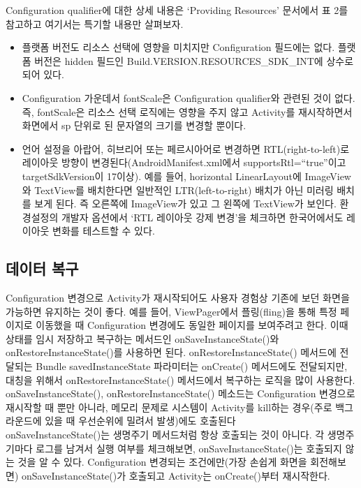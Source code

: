Configuration qualifier에 대한 상세 내용은 `Providing Resources' 문서에서 표 2를 참고하고 여기서는 특기할 내용만 살펴보자.
\begin{itemize}
\item 플랫폼 버전도 리소스 선택에 영향을 미치지만  Configuration 필드에는 없다. 플랫폼 버전은 hidden 필드인 Build.VERSION.RESOURCES\_SDK\_INT에 상수로 되어 있다. 
\item Configuration 가운데서 fontScale은 Configuration qualifier와 관련된 것이 없다. 즉, fontScale은 리소스 선택 로직에는 영향을 주지 않고 Activity를 재시작하면서 화면에서 sp 단위로 된 문자열의 크기를 변경할 뿐이다.
\item 언어 설정을 아랍어, 히브리어 또는 페르시아어로 변경하면 RTL(right-to-left)로 레이아웃 방향이 변경된다(AndroidManifest.xml에서 supportsRtl=``true''이고 targetSdkVersion이 17이상). 예를 들어, horizontal LinearLayout에 ImageView와 TextView를 배치한다면 일반적인 LTR(left-to-right) 배치가 아닌 미러링 배치를 보게 된다. 즉 오른쪽에 ImageView가 있고 그 왼쪽에 TextView가 보인다. 환경설정의 개발자 옵션에서 `RTL 레이아웃 강제 변경'을 체크하면 한국어에서도 레이아웃 변화를 테스트할 수 있다. 
\end{itemize}

\subsection{데이터 복구}
Configuration 변경으로 Activity가 재시작되어도 사용자 경험상 기존에 보던 화면을 가능하면 유지하는 것이 좋다. 예를 들어, ViewPager에서 플링(fling)을 통해 특정 페이지로 이동했을 때 Configuration 변경에도 동일한 페이지를 보여주려고 한다. 이때 상태를 임시 저장하고 복구하는 메서드인 onSaveInstanceState()와 onRestoreInstanceState()를 사용하면 된다. onRestoreInstanceState() 메서드에 전달되는 Bundle savedInstanceState 파라미터는 onCreate() 메서드에도 전달되지만, 대칭을 위해서 onRestoreInstanceState() 메서드에서 복구하는 로직을 많이 사용한다.
onSaveInstanceState(), onRestoreInstanceState() 메소드는 Configuration 변경으로 재시작할 때 뿐만 아니라, 메모리 문제로 시스템이 Activity를 kill하는 경우(주로 백그라운드에 있을 때 우선순위에 밀려서 발생)에도 호출된다\\

onSaveInstanceState()는 생명주기 메서드처럼 항상 호출되는 것이 아니다.
각 생명주기마다 로그를 남겨서 실행 여부를 체크해보면, onSaveInstanceState()는 호출되지 않는 것을 알 수 있다. 
Configuration 변경되는 조건에만(가장 손쉽게 화면을 회전해보면) onSaveInstanceState()가 호출되고 Activity는 onCreate()부터 재시작한다.\\

